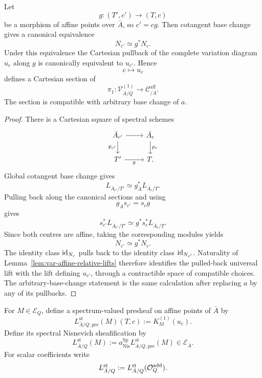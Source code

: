 \begin{proposition}
\label{prop:var-universal-first-cartesian}
Let
\[
    g:(T',c')\longrightarrow(T,c)
\]
be a morphism of affine points over \(\bar A\), so \(c'=cg\). Then cotangent base change gives a canonical equivalence
\[
    \boxed{
    N_{c'}\simeq g^*N_c.
    }
\]
Under this equivalence the Cartesian pullback of the complete variation diagram \(u_c\) along \(g\) is canonically equivalent to \(u_{c'}\). Hence
\[
    c\longmapsto u_c
\]
defines a Cartesian section of
\[
    \pi_1:
    \mathcal V^{(1)}_{\bar A/Q}
    \longrightarrow
    \mathcal C^{\mathrm{aff}}_{/\bar A}.
\]
The section is compatible with arbitrary base change of \(a\).
\end{proposition}

\begin{proof}
There is a Cartesian square of spectral schemes
\[
\begin{tikzcd}
\bar A_{c'} \arrow[r] \arrow[d,"p_{c'}"']
& \bar A_c \arrow[d,"p_c"]
\\
T' \arrow[r,"g"']
& T .
\end{tikzcd}
\]
Global cotangent base change gives
\[
    L_{\bar A_{c'}/T'}
    \simeq
    g_{\bar A}^*L_{\bar A_c/T}.
\]
Pulling back along the canonical sections and using
\[
    g_{\bar A}s_{c'}=s_cg
\]
gives
\[
    s_{c'}^*L_{\bar A_{c'}/T'}
    \simeq
    g^*s_c^*L_{\bar A_c/T}.
\]
Since both centres are affine, taking the corresponding modules yields
\[
    N_{c'}\simeq g^*N_c.
\]
The identity class \(\operatorname{id}_{N_c}\) pulls back to the identity class \(\operatorname{id}_{N_{c'}}\). Naturality of Lemma~\ref{lem:var-affine-relative-lifts} therefore identifies the pulled-back universal lift with the lift defining \(u_{c'}\), through a contractible space of compatible choices. The arbitrary-base-change statement is the same calculation after replacing \(a\) by any of its pullbacks.
\end{proof}

\begin{definition}
\label{def:var-coeff-cotangent}
For \(M\in\mathcal E_Q\), define a spectrum-valued presheaf on affine points of \(\bar A\) by
\[
    \boxed{
    L^{\mathrm{st}}_{\bar A/Q,\mathrm{pre}}(M)(T,c)
    :=
    K_M^{(1)}(u_c).
    }
\]
Define its spectral Nisnevich sheafification by
\[
    \boxed{
    L^{\mathrm{st}}_{\bar A/Q}(M)
    :=
    a_{\mathrm{Nis}}^{\operatorname{Sp}}
    L^{\mathrm{st}}_{\bar A/Q,\mathrm{pre}}(M)
    \in
    \mathcal E_{\bar A}.
    }
\]
For scalar coefficients write
\[
    L^{\mathrm{st}}_{\bar A/Q}
    :=
    L^{\mathrm{st}}_{\bar A/Q}(\mathcal O^{\mathrm{add}}_Q).
\]
\end{definition}

